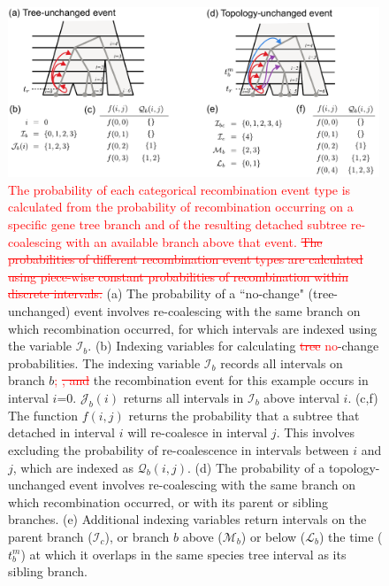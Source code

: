 \documentclass[11pt]{article}
\begin{document}
\begin{figure}[t]
	\centering
	\includegraphics[width=0.99\textwidth]{figures/current/Fig3-interval-functions.pdf}
	\caption{
		\textcolor{red}{The probability of each categorical
		recombination event type is calculated from the probability
		of recombination occurring on a specific gene tree branch and of
		the resulting detached subtree re-coalescing with an available
		branch above that event.}
		\textcolor{red}{\sout{
		The probabilities of different recombination event types are calculated using piece-wise constant probabilities of recombination within discrete
		intervals.}}
		(a) The probability of a ``no-change" (tree-unchanged) event involves
		re-coalescing with the same branch on which recombination occurred,
		for which intervals are indexed using the variable $\mathcal{I}_b$.
		(b) Indexing variables for calculating 
		\textcolor{red}{\sout{tree}}
		\textcolor{red}{no}-change probabilities. The indexing variable $\mathcal{I}_b$ records all
		intervals on branch $b$\textcolor{red}{; \sout{, and}}
		the recombination event for this example occurs in interval $i$=0.
		$\mathcal{J}_b(i)$ returns all intervals
		in $\mathcal{I}_b$ above interval $i$.
		(c,f) The function $f(i,j)$ returns the probability that a subtree that detached 
		in interval $i$ will re-coalesce in interval $j$. This involves excluding
		the probability of re-coalescence in intervals between $i$ and $j$, which are 
		indexed as $\mathcal{Q}_b(i,j)$. 
		(d) The probability of a topology-unchanged event involves re-coalescing with the 
		same branch on which recombination occurred, or with its parent or sibling branches. 
		(e) Additional indexing variables return intervals on the parent branch 
		($\mathcal{I}_c$), or branch $b$ above ($\mathcal{M}_b$) or below 
		($\mathcal{L}_b$) the time ($t_b^m$) at which it overlaps in the same species tree interval 
		as its sibling branch.
	}
	\label{fig:fig3}
\end{figure}
\end{document}
